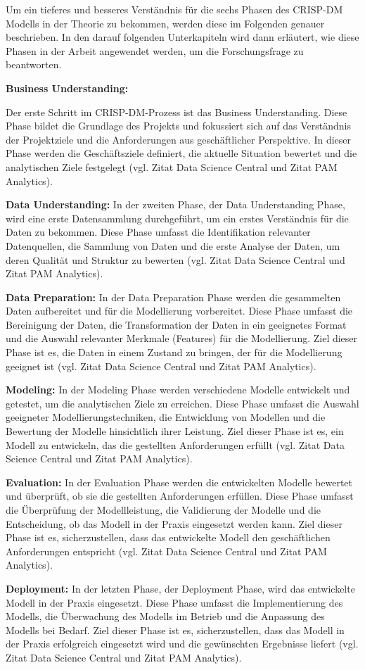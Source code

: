 Um ein tieferes und besseres Verständnis für die sechs Phasen des CRISP-DM Modells in der Theorie zu bekommen, werden diese im Folgenden genauer beschrieben. In den darauf folgenden Unterkapiteln wird dann erläutert, wie diese Phasen in der Arbeit angewendet werden, um die Forschungsfrage zu beantworten.

\textbf{Business Understanding:}

Der erste Schritt im CRISP-DM-Prozess ist das Business Understanding. Diese Phase bildet die Grundlage des Projekts und fokussiert sich auf das Verständnis der Projektziele und die Anforderungen aus geschäftlicher Perspektive. In dieser Phase werden die Geschäftsziele definiert, die aktuelle Situation bewertet und die analytischen Ziele festgelegt (vgl. Zitat Data Science Central und Zitat PAM Analytics).

\textbf{Data Understanding:}
In der zweiten Phase, der Data Understanding Phase, wird eine erste Datensammlung durchgeführt, um ein erstes Verständnis für die Daten zu bekommen. Diese Phase umfasst die Identifikation relevanter Datenquellen, die Sammlung von Daten und die erste Analyse der Daten, um deren Qualität und Struktur zu bewerten (vgl. Zitat Data Science Central und Zitat PAM Analytics).

\textbf{Data Preparation:}
In der Data Preparation Phase werden die gesammelten Daten aufbereitet und für die Modellierung vorbereitet. Diese Phase umfasst die Bereinigung der Daten, die Transformation der Daten in ein geeignetes Format und die Auswahl relevanter Merkmale (Features) für die Modellierung. Ziel dieser Phase ist es, die Daten in einem Zustand zu bringen, der für die Modellierung geeignet ist (vgl. Zitat Data Science Central und Zitat PAM Analytics).

\textbf{Modeling:}
In der Modeling Phase werden verschiedene Modelle entwickelt und getestet, um die analytischen Ziele zu erreichen. Diese Phase umfasst die Auswahl geeigneter Modellierungstechniken, die Entwicklung von Modellen und die Bewertung der Modelle hinsichtlich ihrer Leistung. Ziel dieser Phase ist es, ein Modell zu entwickeln, das die gestellten Anforderungen erfüllt (vgl. Zitat Data Science Central und Zitat PAM Analytics).

\textbf{Evaluation:}
In der Evaluation Phase werden die entwickelten Modelle bewertet und überprüft, ob sie die gestellten Anforderungen erfüllen. Diese Phase umfasst die Überprüfung der Modellleistung, die Validierung der Modelle und die Entscheidung, ob das Modell in der Praxis eingesetzt werden kann. Ziel dieser Phase ist es, sicherzustellen, dass das entwickelte Modell den geschäftlichen Anforderungen entspricht (vgl. Zitat Data Science Central und Zitat PAM Analytics).

\textbf{Deployment:}
In der letzten Phase, der Deployment Phase, wird das entwickelte Modell in der Praxis eingesetzt. Diese Phase umfasst die Implementierung des Modells, die Überwachung des Modells im Betrieb und die Anpassung des Modells bei Bedarf. Ziel dieser Phase ist es, sicherzustellen, dass das Modell in der Praxis erfolgreich eingesetzt wird und die gewünschten Ergebnisse liefert (vgl. Zitat Data Science Central und Zitat PAM Analytics).